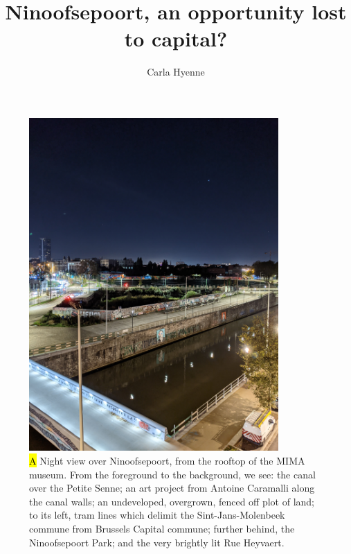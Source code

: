 \documentclass{article}[11pt]
\title{Ninoofsepoort, an opportunity lost to capital?}
\author{Carla Hyenne}
\date{}
\begin{document}

\maketitle

\begin{figure}[h!]
	\centering
	\captionsetup{labelformat=empty}
	\includegraphics[width=0.85\textwidth, angle=-90]{bxl_canal_far}
	\caption{\hl{A} Night view over Ninoofsepoort, from the rooftop of the MIMA museum. From the foreground to the background, we see: the canal over the Petite Senne; an art project from Antoine Caramalli along the canal walls; an undeveloped, overgrown, fenced off plot of land; to its left, tram lines which delimit the Sint-Jans-Molenbeek commune from Brussels Capital commune; further behind, the Ninoofsepoort Park; and the very brightly lit Rue Heyvaert.}
\end{figure}

\restoregeometry

\pagebreak
\end{document}
